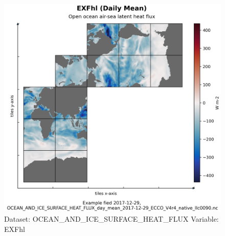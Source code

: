 \begin{figure}[H]
\centering
\includegraphics[scale=0.55]{../images/plots/native_plots/Ocean_and_Sea-Ice_Surface_Heat_Fluxes/EXFhl.png}
\caption{Dataset: OCEAN\_AND\_ICE\_SURFACE\_HEAT\_FLUX Variable: EXFhl}
\label{tab:table-OCEAN_AND_ICE_SURFACE_HEAT_FLUX_EXFhl-Plot}
\end{figure}
\pagebreak
